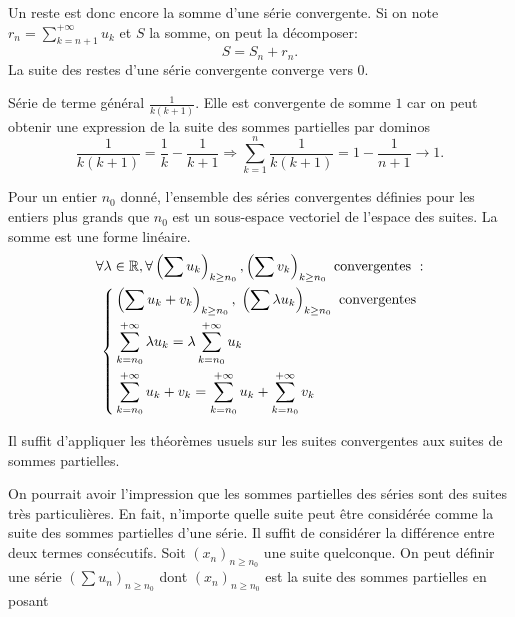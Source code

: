 Un reste est donc encore la somme d'une série convergente. Si on note $r_n = \sum_{k=n+1}^{+\infty} u_k$ et $S$ la somme, on peut la décomposer:
\begin{displaymath}
  S = S_n + r_n .
\end{displaymath}
La suite des restes d'une série convergente converge vers $0$.
\newpage
\begin{exple}
  Série de terme général $\frac{1}{k(k+1)}$.\newline
  Elle est convergente de somme $1$ car on peut obtenir une expression de la suite des sommes partielles par dominos
  \[
   \frac{1}{k(k+1)} = \frac{1}{k} - \frac{1}{k+1} \Rightarrow \sum_{k=1}^{n}\frac{1}{k(k+1)} = 1 - \frac{1}{n+1} \rightarrow 1.
  \]
\end{exple}
\newpage
\begin{prop}
  Pour un entier $n_0$ donné, l'ensemble des séries convergentes définies pour les entiers plus grands que $n_0$ est un sous-espace vectoriel de l'espace des suites. La somme est une forme linéaire.
\begin{multline*}
  \forall\lambda \in \mathbb{R}, \forall \left( \sum u_k \right)_{k\geq n_0}, \left( \sum v_k \right)_{k\geq n_0} \text{ convergentes }: \\
\left\lbrace 
\begin{aligned}
  &\left( \sum u_k + v_k\right)_{k\geq n_0}, \; \left( \sum \lambda u_k \right)_{k\geq n_0} \text{ convergentes}\\
  &\sum_{k=n_0}^{+\infty} \lambda u_k = \lambda \sum_{k=n_0}^{+\infty}  u_k\\
  &\sum_{k=n_0}^{+\infty} u_k + v_k = \sum_{k=n_0}^{+\infty} u_k + \sum_{k=n_0}^{+\infty}  v_k
\end{aligned}
\right. 
\end{multline*}
\end{prop}
\begin{demo}
  Il suffit d'appliquer les théorèmes usuels sur les suites convergentes aux suites de sommes partielles.
\end{demo}
\clearpage
On pourrait avoir l'impression que les sommes partielles des séries sont des suites très particulières. En fait, n'importe quelle suite peut être considérée comme la suite des sommes partielles d'une série. Il suffit de considérer la différence entre deux termes consécutifs.\newline
Soit $\left( x_n\right)_{n\geq n_0}$ une suite quelconque. On peut définir une série $\left( \sum u_n\right)_{n\geq n_0}$ dont $\left( x_n\right)_{n\geq n_0}$ est la suite des sommes partielles en posant
